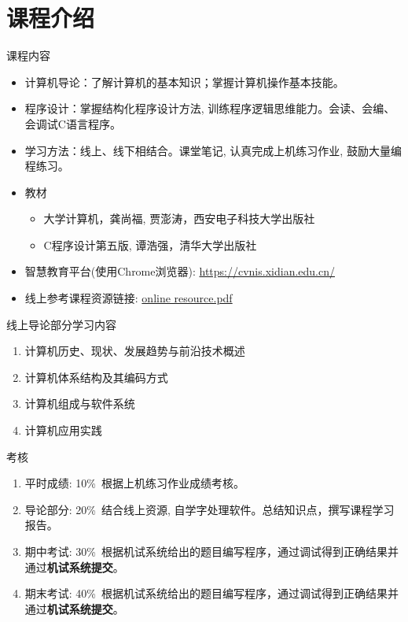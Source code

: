 
\section{课程介绍}

\begin{frame}[shrink]{课程内容}
\begin{itemize}
	\item 计算机导论：了解计算机的基本知识；掌握计算机操作基本技能。
	\item 程序设计：掌握结构化程序设计方法, 训练程序逻辑思维能力。会读、会编、会调试C语言程序。
	\item 学习方法：线上、线下相结合。课堂笔记, 认真完成上机练习作业, 鼓励大量编程练习。
	\item 教材
	\begin{itemize}
		\item 大学计算机，龚尚福, 贾澎涛，西安电子科技大学出版社
		\item C程序设计第五版, 谭浩强，清华大学出版社
	\end{itemize}
	\item 智慧教育平台(使用Chrome浏览器): 
	\href{https://cvnis.xidian.edu.cn/}{ https://cvnis.xidian.edu.cn/}
	\item 线上参考课程资源链接:
	\href{./online resource.pdf}{online resource.pdf} %
\end{itemize}
\end{frame}

\begin{frame}{线上导论部分学习内容}
\begin{enumerate}
	\setlength{\itemsep}{.8cm}
	\item 计算机历史、现状、发展趋势与前沿技术概述
	\item 计算机体系结构及其编码方式
	\item 计算机组成与软件系统
	\item 计算机应用实践
\end{enumerate}
\end{frame}

\begin{frame}{考核}
\begin{enumerate}
	\setlength{\itemsep}{.5cm}
	\item 平时成绩: 10\%~根据上机练习作业成绩考核。
	\item 导论部分: 20\%~结合线上资源, 自学字处理软件。总结知识点，撰写课程学习报告。
	\item 期中考试: 30\%~根据机试系统给出的题目编写程序，通过调试得到正确结果并通过\textbf{机试系统提交}。
	\item 期末考试: 40\%~根据机试系统给出的题目编写程序，通过调试得到正确结果并通过\textbf{机试系统提交}。
\end{enumerate}
\end{frame}

